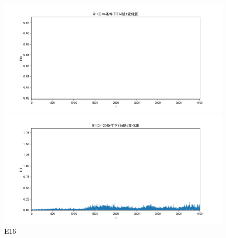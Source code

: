 \documentclass[10pt, a4paper]{article}
\begin{document}
    \begin{figure}[H]
        \begin{minipage}[t]{0.49\textwidth}
            \centering
            \includegraphics[width=\textwidth]{./q5_pics/cmp/E16.png}
        \end{minipage}
        \begin{minipage}[t]{0.49\textwidth}
            \centering
            \includegraphics[width=\textwidth]{./q5_pics/exp/E16.png}
        \end{minipage}
        \caption{E16}\label{fig:E16 in q5}
    \end{figure}
\end{document}
